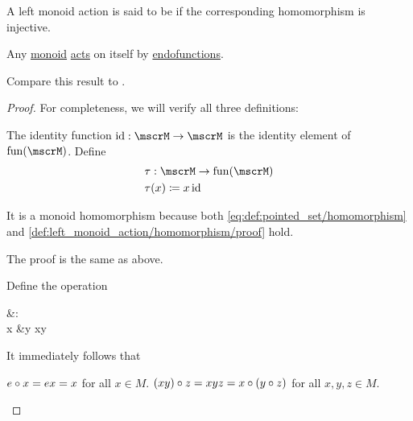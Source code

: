 \begin{definition}\label{def:faithful_left_monoid_action}
  A left monoid action is said to be  if the corresponding homomorphism is injective.
\end{definition}

\begin{proposition}\label{thm:monoid_is_action}
  Any \hyperref[def:unital_magma/monoid]{monoid} \hyperref[def:left_monoid_action]{acts} on itself by \hyperref[def:multi_valued_function/endofunction]{endofunctions}.

  Compare this result to .
\end{proposition}
\begin{proof}
  For completeness, we will verify all three definitions:

   The identity function \( \id: \mscrM \to \mscrM \) is the identity element of \( \fun(\mscrM) \). Define
  \begin{align*}
    &\tau: \mscrM \to \fun(\mscrM) \\
    &\tau(x) \coloneqq x \id
  \end{align*}

  It is a monoid homomorphism because both \eqref{eq:def:pointed_set/homomorphism} and \eqref{def:left_monoid_action/homomorphism/proof} hold.

   The proof is the same as above.

   Define the operation
  \begin{balign*}
    {}&\star{}: \mscrM \times \mscrM \to \mscrM \\
    x &\star y \coloneqq xy
  \end{balign*}

  It immediately follows that
  \begin{refenum}
     \( e \bincirc x = ex = x \) for all \( x \in M \).
     \( (x y) \bincirc z = xyz = x \bincirc (y \bincirc z) \) for all \( x, y, z \in M \).
  \end{refenum}
\end{proof}

